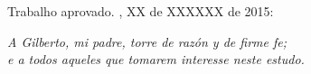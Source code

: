 \begin{folhadeaprovacao}

  \begin{center}
    {\ABNTEXchapterfont\large\imprimirautor}

    \vspace*{\fill}\vspace*{\fill}
    \begin{center}
      \ABNTEXchapterfont\bfseries\Large\imprimirtitulo
    \end{center}
    \vspace*{\fill}
    
    \hspace{.45\textwidth}
    \begin{minipage}{.5\textwidth}
        \imprimirpreambulo
    \end{minipage}%
    \vspace*{\fill}
   \end{center}
        
   Trabalho aprovado. \imprimirlocal, XX de XXXXXX de 2015:

      
  
\end{folhadeaprovacao}


\begin{dedicatoria}
   \vspace*{\fill}
   \centering
   \noindent
   \textit{ A Gilberto, mi padre, torre de razón y de firme fe; \\ e a todos aqueles que tomarem interesse neste estudo.} \vspace*{\fill}
\end{dedicatoria}

